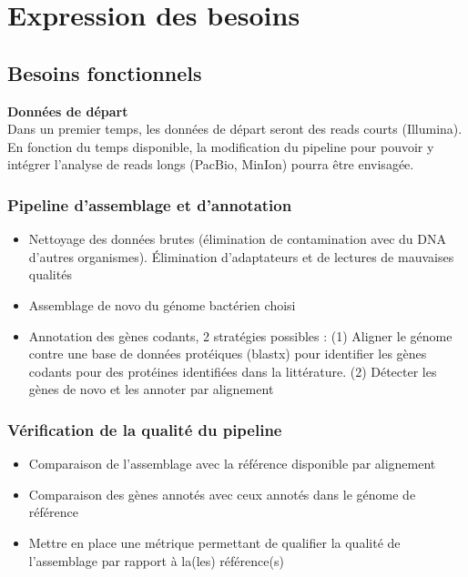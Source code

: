 \section{Expression des besoins}

\subsection{Besoins fonctionnels}

\textbf{Données de départ} \\
\forceindent Dans un premier temps, les données de départ seront des reads courts (Illumina). En fonction du temps disponible, la modification du pipeline pour pouvoir y intégrer l’analyse de reads longs (PacBio, MinIon) pourra être envisagée. 


\subsubsection{Pipeline d'assemblage et d'annotation}

\begin{itemize}
\setlength{\itemindent}{.2in}
\item Nettoyage des données brutes (élimination de contamination avec du DNA d’autres organismes). Élimination d’adaptateurs et de lectures de mauvaises qualités
\item Assemblage de novo du génome bactérien choisi
\item Annotation des gènes codants, 2 stratégies possibles : (1) Aligner le génome contre une base de données protéiques (blastx) pour identifier les gènes codants pour des protéines identifiées dans la littérature. (2) Détecter les gènes de novo et les annoter par alignement
\end{itemize}

\subsubsection{Vérification de la qualité du pipeline}

\begin{itemize}
\setlength{\itemindent}{.2in}
\item Comparaison de l’assemblage avec la référence disponible par alignement
\item Comparaison des gènes annotés avec ceux annotés dans le génome de référence
\item Mettre en place une métrique permettant de qualifier la qualité de l’assemblage par rapport à la(les) référence(s) 
\end{itemize}


